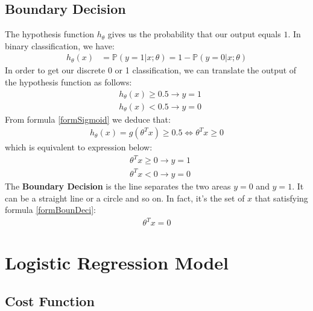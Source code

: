 \subsection{Boundary Decision}
The hypothesis function $h_\theta$ gives us the probability that our output equals $1$. In binary classification, we have:
\begin{align*}
h_\theta(x) &= \mathbb{P}(y=1 | x ; \theta) = 1 - \mathbb{P}(y=0 | x ; \theta)
\end{align*} 
In order to get our discrete 0 or 1 classification, we can translate the output of the hypothesis function as follows:
\begin{align*}
& h_\theta(x) \geq 0.5 \rightarrow y = 1 \\
& h_\theta(x) < 0.5 \rightarrow y = 0
\end{align*}
From formula \eqref{formSigmoid} we deduce that:
\begin{align*}
h_\theta(x) = g(\theta^T x) \geq 0.5 \Leftrightarrow \theta^T x \geq 0
\end{align*}
which is equivalent to expression below: 
\begin{align}
& \theta^T x \geq 0 \rightarrow y = 1 \\
& \theta^T x < 0 \rightarrow y = 0 \nonumber
\end{align}
The \textbf{Boundary Decision} is the line separates the two areas $y = 0$ and $y = 1$. It can be a straight line or a circle and so on. In fact, it's the set of $x$ that satisfying formula \eqref{formBounDeci}:
\begin{align} \label{formBounDeci}
\theta^Tx = 0
\end{align}

\section{Logistic Regression Model}
\subsection{Cost Function}
